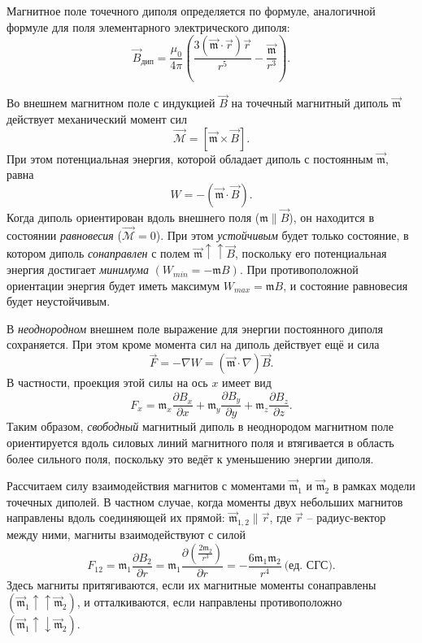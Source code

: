 \documentclass[a4paper,10pt]{article}
\begin{document}
Магнитное поле точечного диполя определяется по формуле, аналогичной формуле для поля элементарного электрического диполя:\[\vec{B}_{\text{дип}}=\frac{\mu_0}{4\pi}\left(\frac{3\left(\vec{\mathfrak{m}}\cdot\vec{r}\right)\vec{r}}{r^5}-\frac{\vec{\mathfrak{m}}}{r^3}\right).\]

Во внешнем магнитном поле с индукцией $\vec{B}$ на точечный магнитный диполь $\vec{\mathfrak{m}}$ действует механический момент сил\[\vec{\mathcal{M}}=\left[\vec{\mathfrak{m}}\times\vec{B}\right].\]При этом потенциальная энергия, которой обладает диполь с постоянным $\vec{\mathfrak{m}}$, равна\[W=-\left(\vec{\mathfrak{m}}\cdot\vec{B}\right).\]Когда диполь ориентирован вдоль внешнего поля ($\mathfrak{m}\parallel\vec{B}$), он находится в состоянии \textit{равновесия} ($\vec{\mathcal{M}}=0$). При этом \textit{устойчивым} будет только состояние, в котором диполь \textit{сонаправлен} с полем $\vec{\mathfrak{m}}\uparrow\uparrow\vec{B}$, поскольку его потенциальная энергия достигает \textit{минимума} $(W_{min}=-\mathfrak{m}B)$. При противоположной ориентации энергия будет иметь максимум $W_{max}=\mathfrak{m}B$, и состояние равновесия будет неустойчивым.

В \textit{неоднородном} внешнем поле выражение для энергии постоянного диполя сохраняется. При этом кроме момента сил на диполь действует ещё и сила\[\vec{F}=-\nabla W=\left(\vec{\mathfrak{m}}\cdot\nabla\right)\vec{B}.\]В частности, проекция этой силы на ось $x$ имеет вид\[F_x=\mathfrak{m}_x\frac{\partial B_x}{\partial x}+\mathfrak{m}_y\frac{\partial B_y}{\partial y}+\mathfrak{m}_z\frac{\partial B_z}{\partial z}.\]Таким образом, \textit{свободный} магнитный диполь в неоднородом магнитном поле ориентируется вдоль силовых линий магнитного поля и втягивается в область более сильного поля, поскольку это ведёт к уменьшению энергии диполя.

Рассчитаем силу взаимодействия магнитов с моментами $\vec{\mathfrak{m}}_1$ и $\vec{\mathfrak{m}}_2$ в рамках модели точечных диполей. В частном случае, когда моменты двух небольших магнитов направлены вдоль соединяющей их прямой: $\vec{\mathfrak{m}}_{1,2}\parallel\vec{r}$, где $\vec{r}$ -- радиус-вектор между ними, магниты взаимодействуют с силой\[F_{12}=\mathfrak{m}_1\frac{\partial B_2}{\partial r}=\mathfrak{m}_1\frac{\partial\left(\frac{2\mathfrak{m}_2}{r^3}\right)}{\partial r}=-\frac{6\mathfrak{m}_1\mathfrak{m}_2}{r^4}\ \text{(ед. СГС).}\]Здесь магниты притягиваются, если их магнитные моменты сонаправлены $(\vec{\mathfrak{m}}_1\uparrow\uparrow\vec{\mathfrak{m}}_2)$, и отталкиваются, если направлены противоположно $(\vec{\mathfrak{m}}_1\uparrow\downarrow\vec{\mathfrak{m}}_2)$.
\end{document}
